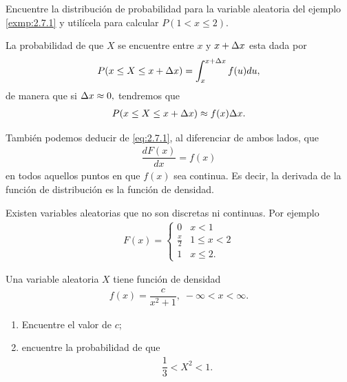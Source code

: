 	\begin{ejemplo}
	  \label{exmp:2.7.2}
	  Encuentre la distribución de probabilidad para la variable aleatoria del ejemplo
	  \ref{exmp:2.7.1} y utilícela para calcular $P(1 < x \leq 2).$
	\end{ejemplo}



	La probabilidad de que $X$ se encuentre entre $x$ y $x+\Delta x$ esta dada por
	\begin{align}
		\label{eq:2.7.4}
		P(x \leq X \leq x+\Delta x)= \int_{x}^{x+\Delta x}f(u)du,
	\end{align}
	de manera que si $\Delta x \approx 0,$ tendremos que
	\begin{align}
		\label{eq:2.7.5}
		P(x \leq X \leq x+\Delta x)\approx f(x) \Delta x.
	\end{align}



	También podemos deducir de \eqref{eq:2.7.1}, al diferenciar de ambos lados, que
	\begin{align}
		\label{eq:2.7.6}
		\dfrac{dF(x)}{dx} = f(x)
	\end{align}
en todos aquellos puntos en que $f(x)$ sea continua.  Es decir, la derivada de la función de distribución es la función de densidad.


	\begin{observacion}
		Existen variables aleatorias que no son discretas ni continuas.  Por ejemplo
		\begin{align}
			F(x)=
			\begin{cases}
				0 & x <1 \\
				\frac{x}{2} & 1 \leq x < 2 \\
				1 & x \leq 2.
			\end{cases}
		\end{align}

	\end{observacion}



 \begin{ejemplo}
  \label{exmp:2.7.3} Una variable aleatoria $X$ tiene función de densidad
  \begin{align}
   f(x)=\dfrac{c}{x^{2}+1}, \; -\infty < x <\infty.
  \end{align}

  \begin{enumerate}
   \item Encuentre el valor de $c$; 
   \item encuentre la probabilidad de que
   \begin{align}
    \dfrac{1}{3}< X^{2} <1.
   \end{align}

  \end{enumerate}

 \end{ejemplo}



